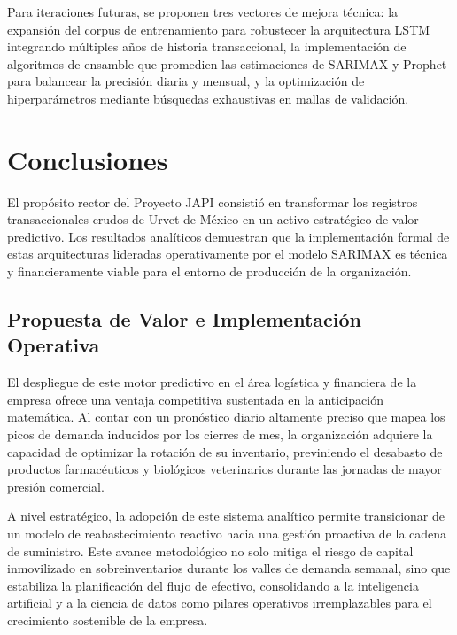 \documentclass[11pt,a4paper]{report}
\begin{document}
    Para iteraciones futuras, se proponen tres vectores de mejora técnica: la expansión del corpus de entrenamiento para robustecer
    la arquitectura LSTM integrando múltiples años de historia transaccional, la implementación de algoritmos de ensamble que promedien
    las estimaciones de SARIMAX y Prophet para balancear la precisión diaria y mensual, y la optimización de hiperparámetros mediante
    búsquedas exhaustivas en mallas de validación.

\section{Conclusiones}
El propósito rector del Proyecto JAPI consistió en transformar los registros transaccionales crudos de Urvet de México en un activo
estratégico de valor predictivo. Los resultados analíticos demuestran que la implementación formal de estas arquitecturas lideradas
operativamente por el modelo SARIMAX es técnica y financieramente viable para el entorno de producción de la organización.

    \subsection{Propuesta de Valor e Implementación Operativa}
    El despliegue de este motor predictivo en el área logística y financiera de la empresa ofrece una ventaja competitiva
    sustentada en la anticipación matemática. Al contar con un pronóstico diario altamente preciso que mapea los picos de demanda inducidos por
    los cierres de mes, la organización adquiere la capacidad de optimizar la rotación de su inventario, previniendo el desabasto de productos
    farmacéuticos y biológicos veterinarios durante las jornadas de mayor presión comercial.

    A nivel estratégico, la adopción de este sistema analítico permite transicionar de un modelo de reabastecimiento reactivo hacia una gestión
    proactiva de la cadena de suministro. Este avance metodológico no solo mitiga el riesgo de capital inmovilizado en sobreinventarios durante
    los valles de demanda semanal, sino que estabiliza la planificación del flujo de efectivo, consolidando a la inteligencia artificial y a
    la ciencia de datos como pilares operativos irremplazables para el crecimiento sostenible de la empresa.
\end{document}
